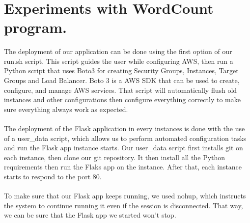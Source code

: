 \section{Experiments with WordCount program. } \label{T1}

\paragraph{}The deployment of our application can be done using the first option of our run.sh script. This script guides the user while configuring AWS, then run a Python script that uses Boto3 for creating Security Groups, Instances, Target Groups and Load Balancer. Boto 3 is a AWS SDK that can be used to create, configure, and manage AWS services. That script will automatically flush old instances and other configurations then configure everything correctly to make sure everything always work as expected.
\paragraph{}The deployment of the Flask application in every instances is done with the use of a user\_data script, which allows us to perform automated configuration tasks and run the Flask app instance starts. Our user\_data script first installs git on each instance, then clone our git repository. It then install all the Python requirements then run the Flaks app on the instance. After that, each instance starts to respond to the port 80.
\paragraph{}To make sure that our Flask app keeps running, we used nohup, which instructs the system to continue running it even if the session is disconnected. That way, we can be sure that the Flask app we started won't stop.